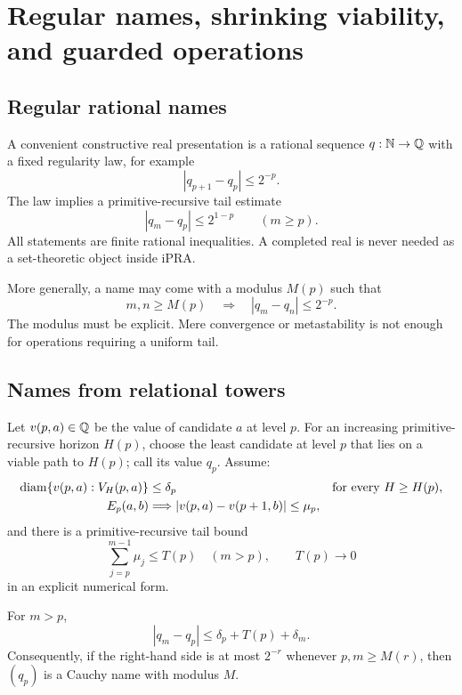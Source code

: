 \section{Regular names, shrinking viability, and guarded operations}
\label{sec:namesguards}

\subsection{Regular rational names}

A convenient constructive real presentation is a rational sequence
\(q:\mathbb N\to\mathbb Q\) with a fixed regularity law, for example
\[
       |q_{p+1}-q_p|\le 2^{-p}.
\]
The law implies a primitive-recursive tail estimate
\[
       |q_m-q_p|\le 2^{1-p}
       \qquad(m\ge p).
\]
All statements are finite rational inequalities.  A completed real is never
needed as a set-theoretic object inside iPRA.

More generally, a name may come with a modulus \(M(p)\) such that
\[
 m,n\ge M(p)\quad\Longrightarrow\quad |q_m-q_n|\le 2^{-p}.
\]
The modulus must be explicit.  Mere convergence or metastability is not enough
for operations requiring a uniform tail.

\subsection{Names from relational towers}

Let \(v(p,a)\in\mathbb Q\) be the value of candidate \(a\) at level \(p\).  For an
increasing primitive-recursive horizon \(H(p)\), choose the least candidate at
level \(p\) that lies on a viable path to \(H(p)\); call its value \(q_p\).
Assume:
\begin{align}
 \operatorname{diam}\{v(p,a):V_{H}(p,a)\}&\le\delta_p
   &&\text{for every }H\ge H(p),\label{eq:diambound}\\
 E_p(a,b)&\Longrightarrow |v(p,a)-v(p+1,b)|\le\mu_p,
   \label{eq:motionbound}
\end{align}
and there is a primitive-recursive tail bound
\[
       \sum_{j=p}^{m-1}\mu_j\le T(p)
       \quad(m>p),
       \qquad T(p)\to0
\]
in an explicit numerical form.

\begin{theorem}
\label{thm:shrinkingname}
For \(m>p\),
\[
      |q_m-q_p|\le \delta_p+T(p)+\delta_m.
\]
Consequently, if the right-hand side is at most \(2^{-r}\) whenever
\(p,m\ge M(r)\), then \((q_p)\) is a Cauchy name with modulus \(M\).
\end{theorem}

